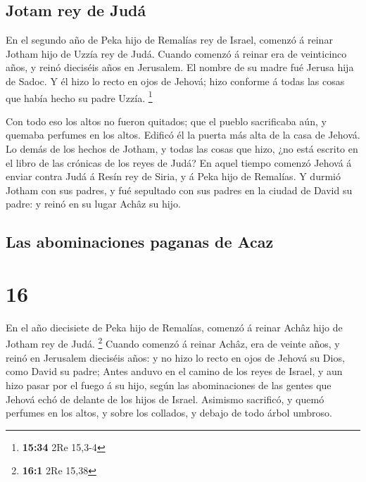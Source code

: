 \hypertarget{jotam-rey-de-juduxe1}{%
\subsection{Jotam rey de Judá}\label{jotam-rey-de-juduxe1}}

 En el segundo año de Peka hijo de Remalías rey de Israel,
comenzó á reinar Jotham hijo de Uzzía rey de Judá.  Cuando
comenzó á reinar era de veinticinco años, y reinó dieciséis años en
Jerusalem. El nombre de su madre fué Jerusa hija de Sadoc. 
Y él hizo lo recto en ojos de Jehová; hizo conforme á todas las cosas
que había hecho su padre Uzzía. \footnote{\textbf{15:34} 2Re 15,3-4}

 Con todo eso los altos no fueron quitados; que el pueblo
sacrificaba aún, y quemaba perfumes en los altos. Edificó él la puerta
más alta de la casa de Jehová.  Lo demás de los hechos de
Jotham, y todas las cosas que hizo, ¿no está escrito en el libro de las
crónicas de los reyes de Judá?  En aquel tiempo comenzó
Jehová á enviar contra Judá á Resín rey de Siria, y á Peka hijo de
Remalías.  Y durmió Jotham con sus padres, y fué sepultado
con sus padres en la ciudad de David su padre: y reinó en su lugar Achâz
su hijo.

\hypertarget{las-abominaciones-paganas-de-acaz}{%
\subsection{Las abominaciones paganas de
Acaz}\label{las-abominaciones-paganas-de-acaz}}

\hypertarget{section-15}{%
\section{16}\label{section-15}}

 En el año diecisiete de Peka hijo de Remalías, comenzó á
reinar Achâz hijo de Jotham rey de Judá. \footnote{\textbf{16:1} 2Re
  15,38}  Cuando comenzó á reinar Achâz, era de veinte años,
y reinó en Jerusalem dieciséis años: y no hizo lo recto en ojos de
Jehová su Dios, como David su padre;  Antes anduvo en el
camino de los reyes de Israel, y aun hizo pasar por el fuego á su hijo,
según las abominaciones de las gentes que Jehová echó de delante de los
hijos de Israel.  Asimismo sacrificó, y quemó perfumes en
los altos, y sobre los collados, y debajo de todo árbol umbroso.


